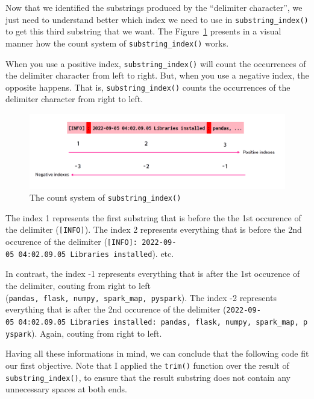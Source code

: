 \documentclass[
  11pt,
  letterpaper,
  DIV=11,
  numbers=noendperiod]{scrreprt}
\begin{document}
Now that we identified the substrings produced by the ``delimiter
character'', we just need to understand better which index we need to
use in \texttt{substring\_index()} to get this third substring that we
want. The Figure~\ref{fig-substring-delimiter2} presents in a visual
manner how the count system of \texttt{substring\_index()} works.

When you use a positive index, \texttt{substring\_index()} will count
the occurrences of the delimiter character from left to right. But, when
you use a negative index, the opposite happens. That is,
\texttt{substring\_index()} counts the occurrences of the delimiter
character from right to left.

\begin{figure}

{\centering \includegraphics{Chapters/./../Figures/substring-delimiter2.png}

}

\caption{\label{fig-substring-delimiter2}The count system of
\texttt{substring\_index()}}

\end{figure}

The index 1 represents the first substring that is before the the 1st
occurence of the delimiter (\texttt{{[}INFO{]}}). The index 2 represents
everything that is before the 2nd occurence of the delimiter
(\texttt{{[}INFO{]}:\ 2022-09-05\ 04:02.09.05\ Libraries\ installed}).
etc.

In contrast, the index -1 represents everything that is after the 1st
occurence of the delimiter, couting from right to left
(\texttt{pandas,\ flask,\ numpy,\ spark\_map,\ pyspark}). The index -2
represents everything that is after the 2nd occurence of the delimiter
(\texttt{2022-09-05\ 04:02.09.05\ Libraries\ installed:\ pandas,\ flask,\ numpy,\ spark\_map,\ pyspark}).
Again, couting from right to left.

Having all these informations in mind, we can conclude that the
following code fit our first objective. Note that I applied the
\texttt{trim()} function over the result of \texttt{substring\_index()},
to ensure that the result substring does not contain any unnecessary
spaces at both ends.
\end{document}
